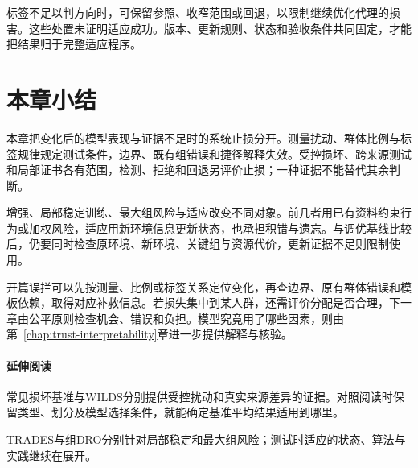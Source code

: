 标签不足以判方向时，可保留参照、收窄范围或回退，以限制继续优化代理的损害。这些处置未证明适应成功。版本、更新规则、状态和验收条件共同固定，才能把结果归于完整适应程序。

\section{本章小结}
\label{sec:robustness-summary}

本章把变化后的模型表现与证据不足时的系统止损分开。测量扰动、群体比例与标签规律规定测试条件，边界、既有组错误和捷径解释失效。受控损坏、跨来源测试和局部证书各有范围，检测、拒绝和回退另评价止损；一种证据不能替代其余判断。

增强、局部稳定训练、最大组风险与适应改变不同对象。前几者用已有资料约束行为或加权风险，适应用新环境信息更新状态，也承担积错与遗忘。与调优基线比较后，仍要同时检查原环境、新环境、关键组与资源代价，更新证据不足则限制使用。

开篇误拦可以先按测量、比例或标签关系定位变化，再查边界、原有群体错误和模板依赖，取得对应补救信息。若损失集中到某人群，还需评价分配是否合理，下一章由公平原则检查机会、错误和负担。模型究竟用了哪些因素，则由第~\ref{chap:trust-interpretability}章进一步提供解释与核验。

\paragraph{延伸阅读}

常见损坏基准与WILDS分别提供受控扰动和真实来源差异的证据。对照阅读时保留类型、划分及模型选择条件，就能确定基准平均结果适用到哪里。

TRADES与组DRO分别针对局部稳定和最大组风险；测试时适应的状态、算法与实践继续在展开。
